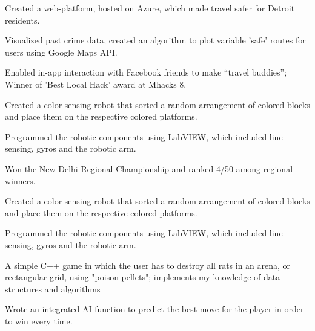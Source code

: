 \documentclass[letterpaper]{deedy-resume-openfont} %
\begin{document}
\begin{minipage}[t]{0.66\textwidth}
\begin{tightemize}
\item Created a web-platform, hosted on Azure, which made travel safer for Detroit residents.
\item Visualized past crime data, created an algorithm to plot variable 'safe' routes for users using Google Maps API.
\item Enabled in-app interaction with Facebook friends to make “travel buddies”; Winner of 'Best Local Hack' award at Mhacks 8.
\end{tightemize}

\sectionsep %

\begin{tightemize}
\item Created a color sensing robot that sorted a random arrangement of colored blocks and place them on the respective colored platforms.
\item Programmed the robotic components using LabVIEW, which included line sensing, gyros and the robotic arm.
\item Won the New Delhi Regional Championship and ranked 4/50 among regional winners.
\end{tightemize}

\sectionsep %

\begin{tightemize}
\item Created a color sensing robot that sorted a random arrangement of colored blocks and place them on the respective colored platforms.
\item Programmed the robotic components using LabVIEW, which included line sensing, gyros and the robotic arm.
\end{tightemize}
\sectionsep %

\begin{tightemize}
\item A simple C++ game in which the user has to destroy all rats in an arena, or rectangular grid, using "poison pellets"; implements my knowledge of data structures and algorithms
\item Wrote an integrated AI function to predict the best move for the player in order to win every time.
\end{tightemize}


\end{minipage} %
\end{document}
